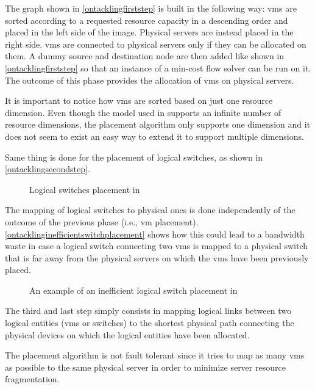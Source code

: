 The graph shown in \autoref{ontacklingfirststep} is built in the following way: \glspl{vm} are sorted according to a requested resource capacity in a descending order and placed in the left side of the image.
Physical servers are instead placed in the right side.
\glspl{vm} are connected to physical servers only if they can be allocated on them.
A dummy source and destination node are then added like shown in \autoref{ontacklingfirststep} so that an instance of a min-cost flow solver can be run on it.
The outcome of this phase provides the allocation of \glspl{vm} on physical servers.

It is important to notice how \glspl{vm} are sorted based on just one resource dimension.
Even though the model used in \cite{ontackling} supports an infinite number of resource dimensions, the placement algorithm only supports one dimension and it does not seem to exist an easy way to extend it to support multiple dimensions.

Same thing is done for the placement of logical switches, as shown in \autoref{ontacklingsecondstep}.

\begin{figure}[!htb]
    \centering
    \usebox{\ontacklingsecondstep}
    \caption{Logical switches placement in \cite{ontackling}}
    \label{ontacklingsecondstep}
\end{figure}

The mapping of logical switches to physical ones is done independently of the outcome of the previous phase (i.e., \gls{vm} placement).
\autoref{ontacklinginefficientswitchplacement} shows how this could lead to a bandwidth waste in case a logical switch connecting two \glspl{vm} is mapped to a physical switch that is far away from the physical servers on which the \glspl{vm} have been previously placed.

\begin{figure}[!htb]
    \centering
    \usebox{\ontacklinginefficientswitchplacement}
    \caption{An example of an inefficient logical switch placement in \cite{ontackling}}
    \label{ontacklinginefficientswitchplacement}
\end{figure}

The third and last step simply consists in mapping logical links between two logical entities (\glspl{vm} or switches) to the shortest physical path connecting the physical devices on which the logical entities have been allocated.

The placement algorithm is not fault tolerant since it tries to map as many \glspl{vm} as possible to the same physical server in order to minimize server resource fragmentation.